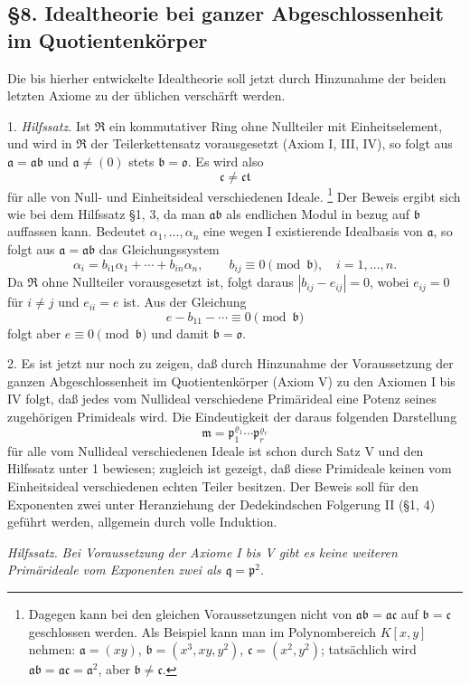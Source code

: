 \documentclass[11pt]{article}
\providecommand{\mR}{\mathfrak{R}}
\providecommand{\ma}{\mathfrak{a}}
\providecommand{\mb}{\mathfrak{b}}
\providecommand{\mc}{\mathfrak{c}}
\providecommand{\mm}{\mathfrak{m}}
\providecommand{\mo}{\mathfrak{o}}
\providecommand{\mpideal}{\mathfrak{p}}
\providecommand{\mq}{\mathfrak{q}}
\providecommand{\mt}{\mathfrak{t}}
\begin{document}
\subsection*{§8. Idealtheorie bei ganzer Abgeschlossenheit im Quotientenkörper}

Die bis hierher entwickelte Idealtheorie soll jetzt durch Hinzunahme der beiden letzten Axiome zu der üblichen verschärft werden.

1. \emph{Hilfssatz.} Ist $\mR$ ein kommutativer Ring ohne Nullteiler mit Einheitselement, und wird in $\mR$ der Teilerkettensatz vorausgesetzt (Axiom I, III, IV), so folgt aus $\ma=\ma\mb$ und $\ma\ne(0)$ stets $\mb=\mo$. Es wird also
\[
        \mc\ne\mc\mt
\]
für alle von Null- und Einheitsideal verschiedenen Ideale.
\footnote{Dagegen kann bei den gleichen Voraussetzungen nicht von $\ma\mb=\ma\mc$ auf $\mb=\mc$ geschlossen werden. Als Beispiel kann man im Polynombereich $K[x,y]$ nehmen: $\ma=(xy)$, $\mb=(x^3,xy,y^2)$, $\mc=(x^2,y^2)$; tatsächlich wird $\ma\mb=\ma\mc=\ma^2$, aber $\mb\ne\mc$.}
Der Beweis ergibt sich wie bei dem Hilfssatz §1, 3, da man $\ma\mb$ als endlichen Modul in bezug auf $\mb$ auffassen kann. Bedeutet $\alpha_1,\ldots,\alpha_n$ eine wegen I existierende Idealbasis von $\ma$, so folgt aus $\ma=\ma\mb$ das Gleichungssystem
\[
        \alpha_i=b_{i1}\alpha_1+\cdots+b_{in}\alpha_n,
        \qquad b_{ij}\equiv0\pmod{\mb},\quad i=1,\ldots,n.
\]
Da $\mR$ ohne Nullteiler vorausgesetzt ist, folgt daraus $|b_{ij}-e_{ij}|=0$, wobei $e_{ij}=0$ für $i\ne j$ und $e_{ii}=e$ ist. Aus der Gleichung
\[
        e-b_{11}-\cdots\equiv0\pmod{\mb}
\]
folgt aber $e\equiv0\pmod{\mb}$ und damit $\mb=\mo$.

2. Es ist jetzt nur noch zu zeigen, daß durch Hinzunahme der Voraussetzung der ganzen Abgeschlossenheit im Quotientenkörper (Axiom V) zu den Axiomen I bis IV folgt, daß jedes vom Nullideal verschiedene Primärideal eine Potenz seines zugehörigen Primideals wird. Die Eindeutigkeit der daraus folgenden Darstellung
\[
        \mm=\mpideal_1^{\varrho_1}\cdots\mpideal_r^{\varrho_r}
\]
für alle vom Nullideal verschiedenen Ideale ist schon durch Satz V und den Hilfssatz unter 1 bewiesen; zugleich ist gezeigt, daß diese Primideale keinen vom Einheitsideal verschiedenen echten Teiler besitzen. Der Beweis soll für den Exponenten zwei unter Heranziehung der Dedekindschen Folgerung II (§1, 4) geführt werden, allgemein durch volle Induktion.

\emph{Hilfssatz.} \emph{Bei Voraussetzung der Axiome I bis V gibt es keine weiteren Primärideale vom Exponenten zwei als $\mq=\mpideal^2$.}
\end{document}
